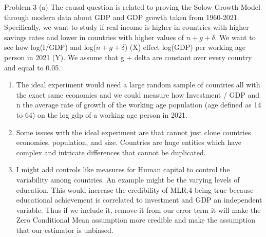 \documentclass[
  12pt,
  landscape]{article}
\begin{document}
Problem 3 (a) The causal question is related to proving the Solow Growth
Model through modern data about GDP and GDP growth taken from 1960-2021.
Specifically, we want to study if real income is higher in countries
with higher savings rates and lower in countries with higher values of
\({ n + g + \delta}\). We want to see how log(I/GDP) and
log(\({ n + g + \delta}\)) (X) effect log(GDP) per working age person in
2021 (Y). We assume that g + delta are constant over every country and
equal to 0.05.

\begin{enumerate}
\def\labelenumi{(\alph{enumi})}
\setcounter{enumi}{1}
\item
  The ideal experiment would need a large random sample of countries all
  with the exact same economies and we could measure how Investment /
  GDP and n the average rate of growth of the working age population
  (age defined as 14 to 64) on the log gdp of a working age person in
  2021.
\item
  Some issues with the ideal experiment are that cannot just clone
  countries economies, population, and size. Countries are huge entities
  which have complex and intricate differences that cannot be
  duplicated.
\item
  I might add controls like measures for Human capital to control the
  variability among countries. An example might be the varying levels of
  education. This would increase the credibility of MLR.4 being true
  because educational achievement is correlated to investment and GDP an
  independent variable. Thus if we include it, remove it from our error
  term it will make the Zero Conditional Mean assumption more credible
  and make the assumption that our estimator is unbiased.
\end{enumerate}
\end{document}
